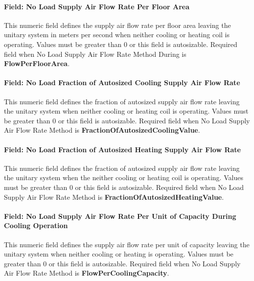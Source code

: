 \paragraph{Field: No Load Supply Air Flow Rate Per Floor Area}\label{field-no-load-supply-air-flow-rate-per-floor-area}

This numeric field defines the supply air flow rate per floor area leaving the unitary system in meters per second when neither cooling or heating coil is operating. Values must be greater than 0 or this field is autosizable. Required field when No Load Supply Air Flow Rate Method During is \textbf{FlowPerFloorArea}.

\paragraph{Field: No Load Fraction of Autosized Cooling Supply Air Flow Rate}\label{field-no-load-fraction-of-autosized-cooling-supply-air-flow-rate}

This numeric field defines the fraction of autosized supply air flow rate leaving the unitary system when neither cooling or heating coil is operating. Values must be greater than 0 or this field is autosizable. Required field when No Load Supply Air Flow Rate Method is \textbf{FractionOfAutosizedCoolingValue}.

\paragraph{Field: No Load Fraction of Autosized Heating Supply Air Flow Rate}\label{field-no-load-fraction-of-autosized-heating-supply-air-flow-rate}

This numeric field defines the fraction of autosized supply air flow rate leaving the unitary system when the neither cooling or heating coil is operating. Values must be greater than 0 or this field is autosizable. Required field when No Load Supply Air Flow Rate Method is \textbf{FractionOfAutosizedHeatingValue}.

\paragraph{Field: No Load Supply Air Flow Rate Per Unit of Capacity During Cooling Operation}\label{field-no-load-supply-air-flow-rate-per-unit-of-capacity-during-cooling-operation}

This numeric field defines the supply air flow rate per unit of capacity leaving the unitary system when neither cooling or heating is operating. Values must be greater than 0 or this field is autosizable. Required field when No Load Supply Air Flow Rate Method is \textbf{FlowPerCoolingCapacity}.

